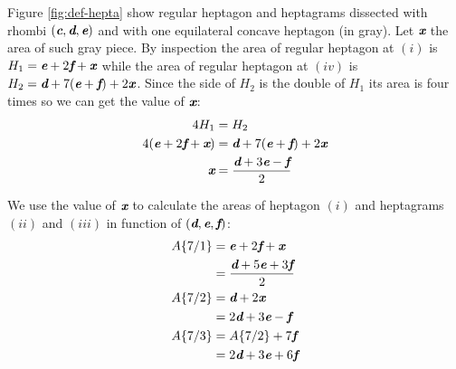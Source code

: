 \documentclass[11pt]{article}
\def\mathbi#1{\textbf{\em #1}}
\begin{document}
Figure \ref{fig:def-hepta} show regular heptagon and heptagrams dissected with rhombi $(\mathbi{c},\mathbi{d},\mathbi{e})$ and with one equilateral concave heptagon (in gray). Let $\mathbi{x}$ the area of such gray piece. By inspection the area of regular heptagon at $(i)$ is $H_1 = \mathbi{e} + 2\mathbi{f} + \mathbi{x}$ while the area of regular heptagon at $(iv)$ is $H_2 = \mathbi{d} + 7(\mathbi{e}+\mathbi{f}) + 2\mathbi{x}$. Since the side of $H_2$ is the double of $H_1$ its area is four times so we can get the value of $\mathbi{x}$:
\begin{align}
4H_1 &= H_2 \nonumber\\
4(\mathbi{e} + 2\mathbi{f} + \mathbi{x}) &= \mathbi{d} + 7(\mathbi{e}+\mathbi{f}) + 2\mathbi{x} \nonumber\\
\mathbi{x} &= \frac{\mathbi{d} + 3\mathbi{e} - \mathbi{f}}2
\end{align}

We use the value of $\mathbi{x}$ to calculate the areas of heptagon $(i)$ and heptagrams $(ii)$ and $(iii)$ in function of $(\mathbi{d},\mathbi{e},\mathbi{f})$:
\begin{align}
A\{7/1\} &= \mathbi{e} + 2\mathbi{f} + \mathbi{x} \nonumber\\
    &= \frac{\mathbi{d} + 5\mathbi{e} + 3\mathbi{f}}2 \\
A\{7/2\} &= \mathbi{d} + 2\mathbi{x} \nonumber\\
 &= 2\mathbi{d} + 3\mathbi{e} - \mathbi{f} \\
A\{7/3\} &= A\{7/2\} + 7\mathbi{f} \nonumber\\
 &= 2\mathbi{d} + 3\mathbi{e} + 6\mathbi{f}
\end{align}
\end{document}
